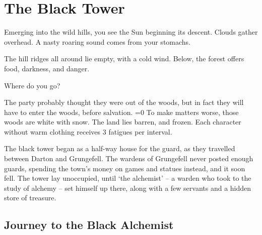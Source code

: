 \chapter{The Black Tower}
\epigraph{
  Emerging into the wild hills, you see the Sun beginning its descent.
  Clouds gather overhead.
  A nasty roaring sound comes from your stomachs.

  The hill ridges all around lie empty, with a cold wind.
  Below, the forest offers food, darkness, and danger.

  Where do you go?
}{}

\begin{multicols}{2}

\noindent
The party probably thought they were out of the woods, but in fact they will have to enter the woods, before salvation.
\ifnum\value{temperature}=0
  To make matters worse, those woods are white with snow.
  The land lies barren, and frozen.
  Each character without warm clothing receives 3 \glspl{fatigue} per \gls{interval}.
\fi

\begin{exampletext}
  The black tower began as a half-way house for the \gls{guard}, as they travelled between Darton and Grungefell.
  The wardens of Grungefell never posted enough guards, spending the town's money on games and statues instead, and it soon fell.
  The tower lay unoccupied, until `the alchemist' -- a warden who took to the study of alchemy -- set himself up there, along with a few servants and a hidden store of treasure.
\end{exampletext}

\end{multicols}

\section{Journey to the Black Alchemist}

